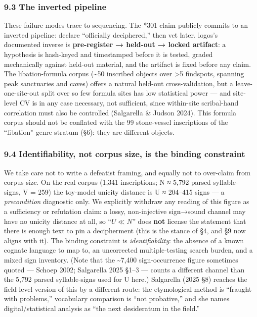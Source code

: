 \documentclass[
  10pt,
]{article}
\begin{document}
\hypertarget{the-inverted-pipeline}{%
\subsubsection{9.3 The inverted pipeline}\label{the-inverted-pipeline}}

These failure modes trace to sequencing. The *301 claim publicly commits
to an inverted pipeline: declare ``officially deciphered,'' then vet
later. logos's documented inverse is \textbf{pre-register → held-out →
locked artifact}: a hypothesis is hash-keyed and timestamped before it
is tested, graded mechanically against held-out material, and the
artifact is fixed before any claim. The libation-formula corpus
(\textasciitilde50 inscribed objects over \textgreater5 findspots,
spanning peak sanctuaries and caves) offers a natural held-out
cross-validation, but a leave-one-site-out split over so few formula
sites has low statistical power --- and site-level CV is in any case
necessary, not sufficient, since within-site scribal-hand correlation
must also be controlled (Salgarella \& Judson 2024). This formula corpus
should not be conflated with the 99 stone-vessel inscriptions of the
``libation'' genre stratum (§6): they are different objects.

\hypertarget{identifiability-not-corpus-size-is-the-binding-constraint}{%
\subsubsection{9.4 Identifiability, not corpus size, is the binding
constraint}\label{identifiability-not-corpus-size-is-the-binding-constraint}}

We take care not to write a defeatist framing, and equally not to
over-claim from corpus size. On the real corpus (1,341 inscriptions; N ≈
5,792 parsed syllable-signs, V = 259) the toy-model unicity distance is
U ≈ 204--415 signs --- a \emph{precondition} diagnostic only. We
explicitly withdraw any reading of this figure as a sufficiency or
refutation claim: a lossy, non-injective sign→sound channel may have no
unicity distance at all, so ``\(U \ll N\)'' does \textbf{not} license
the statement that there is enough text to pin a decipherment (this is
the stance of §4, and §9 now aligns with it). The binding constraint is
\emph{identifiability}: the absence of a known cognate language to map
to, an uncorrected multiple-testing search burden, and a mixed sign
inventory. (Note that the \textasciitilde7,400 sign-occurrence figure
sometimes quoted --- Schoep 2002; Salgarella 2025 §1--3 --- counts a
different channel than the 5,792 parsed syllable-signs used for U here.)
Salgarella (2025 §8) reaches the field-level version of this by a
different route: the etymological method is ``fraught with problems,''
vocabulary comparison is ``not probative,'' and she names
digital/statistical analysis as ``the next desideratum in the field.''
\end{document}
